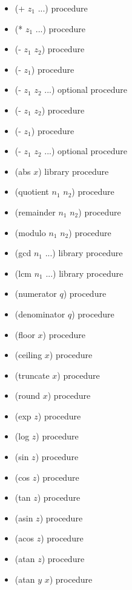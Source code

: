 \documentclass{article}
\begin{document}
\begin{itemize}
\begin{itemize}
		\item (+ $z_1$ ...)	\hfill	procedure
		\item (* $z_1$ ...)	\hfill	procedure
		
		\item (- $z_1$ $z_2$)	\hfill	procedure
		\item (- $z_1$)	\hfill	procedure
		\item (- $z_1$ $z_2$ ...)	\hfill	optional procedure
		\item (- $z_1$ $z_2$)	\hfill	procedure
		\item (- $z_1$)	\hfill	procedure
		\item (- $z_1$ $z_2$ ...)	\hfill	optional procedure
		
		\item (abs $x$)	\hfill	library procedure
		
		\item (quotient $n_1$ $n_2$)	\hfill	procedure
		\item (remainder $n_1$ $n_2$)	\hfill	procedure
		\item (modulo $n_1$ $n_2$)	\hfill	procedure
		
		\item (gcd $n_1$ ...)	\hfill	library procedure
		\item (lcm $n_1$ ...)	\hfill	library procedure
		
		\item (numerator $q$)	\hfill	procedure
		\item (denominator $q$)	\hfill	procedure
		
		\item (floor $x$)	\hfill	procedure
		\item (ceiling $x$)	\hfill	procedure
		\item (truncate $x$)	\hfill procedure
		\item (round $x$)	\hfill	procedure
			
		\item (exp $z$)	\hfill	procedure
		\item (log $z$)	\hfill	procedure
		\item (sin $z$)	\hfill	procedure
		\item (cos $z$)	\hfill	procedure
		\item (tan $z$)	\hfill	procedure
		\item (asin $z$)	\hfill	procedure
		\item (acos $z$)	\hfill	procedure
		\item (atan $z$)	\hfill	procedure
		\item (atan $y$ $x$)	\hfill	procedure
		

\end{itemize}
\end{itemize}
\end{document}
